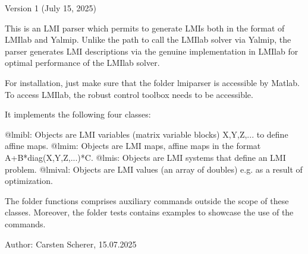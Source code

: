 Version 1 (July 15, 2025)

This is an LMI parser which permits to generate LMIs both in the format of LMIlab and Yalmip.
Unlike the path to call the LMIlab solver via Yalmip, the parser generates LMI descriptions
via the genuine implementation in LMIlab for optimal performance of the LMIlab solver.

For installation, just make sure that the folder lmiparser is accessible by Matlab.
To access LMIlab, the robust control toolbox needs to be accessible.

It implements the following four classes:

@lmibl:  Objects are LMI variables (matrix variable blocks) X,Y,Z,... to define affine maps.
@lmim:   Objects are LMI maps, affine maps in the format A+B*diag(X,Y,Z,...)*C.
@lmis:   Objects are LMI systems that define an LMI problem.
@lmival: Objects are LMI values (an array of doubles) e.g. as a result of optimization.

The folder functions comprises auxiliary commands outside the scope of these classes.
Moreover, the folder tests contains examples to showcase the use of the commands.

Author: Carsten Scherer, 15.07.2025